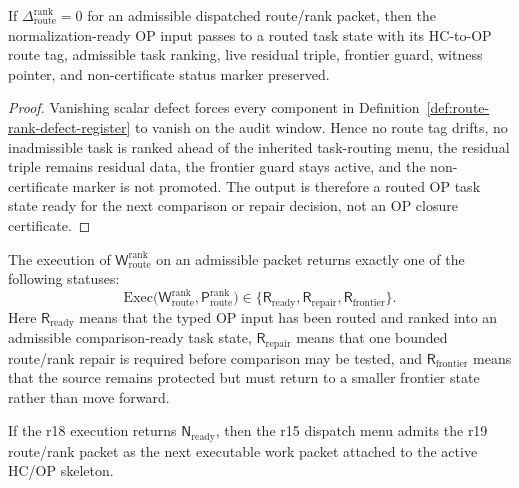 \begin{lemma}
\label{lem:zero-route-rank-defect-preserves-routed-op-task-data}
If \(\Delta_{\mathrm{route}}^{\mathrm{rank}}=0\) for an admissible dispatched route/rank packet, then the normalization-ready OP input passes to a routed task state with its HC-to-OP route tag, admissible task ranking, live residual triple, frontier guard, witness pointer, and non-certificate status marker preserved.
\end{lemma}

\begin{proof}
Vanishing scalar defect forces every component in Definition~\ref{def:route-rank-defect-register} to vanish on the audit window.  Hence no route tag drifts, no inadmissible task is ranked ahead of the inherited task-routing menu, the residual triple remains residual data, the frontier guard stays active, and the non-certificate marker is not promoted.  The output is therefore a routed OP task state ready for the next comparison or repair decision, not an OP closure certificate.
\end{proof}

\begin{definition}
\label{def:r19-route-rank-return}
The execution of \(\mathsf W_{\mathrm{route}}^{\mathrm{rank}}\) on an admissible packet returns exactly one of the following statuses:
\[
\mathrm{Exec}\bigl(\mathsf W_{\mathrm{route}}^{\mathrm{rank}},
                   \mathsf P_{\mathrm{route}}^{\mathrm{rank}}\bigr)
\in
\{\mathsf R_{\mathrm{ready}},\mathsf R_{\mathrm{repair}},\mathsf R_{\mathrm{frontier}}\}.
\]
Here \(\mathsf R_{\mathrm{ready}}\) means that the typed OP input has been routed and ranked into an admissible comparison-ready task state, \(\mathsf R_{\mathrm{repair}}\) means that one bounded route/rank repair is required before comparison may be tested, and \(\mathsf R_{\mathrm{frontier}}\) means that the source remains protected but must return to a smaller frontier state rather than move forward.
\end{definition}

\begin{proposition}
\label{prop:dispatched-route-rank-packet-admissible}
If the r18 execution returns \(\mathsf N_{\mathrm{ready}}\), then the r15 dispatch menu admits the r19 route/rank packet as the next executable work packet attached to the active HC/OP skeleton.
\end{proposition}

